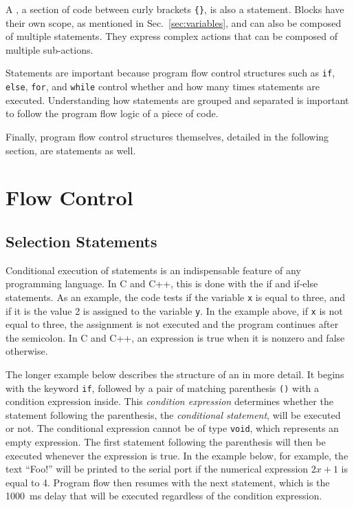 A , a section of code between curly brackets \texttt{\{\}}, is also a statement.
Blocks have their own scope, as mentioned in Sec.~\ref{sec:variables}, and can also be composed of multiple statements.
They express complex actions that can be composed of multiple sub-actions.

Statements are important because program flow control structures such as \texttt{if}, \texttt{else}, \texttt{for}, and \texttt{while} control whether and how many times statements are executed.
Understanding how statements are grouped and separated is important to follow the program flow logic of a piece of code.

Finally, program flow control structures themselves, detailed in the following section, are statements as well.

\section{Flow Control}
\subsection{Selection Statements}
Conditional execution of statements is an indispensable feature of any programming language.
In C and C++, this is done with the if and if-else statements.
As an example, the code  tests if the variable \texttt{x} is equal to three, and if it is the value 2 is assigned to the variable \texttt{y}.
In the example above, if \texttt{x} is not equal to three, the assignment is not executed and the program continues after the semicolon.
In C and C++, an expression is true when it is nonzero and false otherwise.

The longer example below describes the structure of an  in more detail.
It begins with the keyword \texttt{if}, followed by a pair of matching parenthesis \texttt{()} with a condition expression inside.
This \emph{condition expression} determines whether the statement following the parenthesis, the \emph{conditional statement}, will be executed or not.
The conditional expression cannot be of type \texttt{void}, which represents an empty expression.
The first statement following the parenthesis will then be executed whenever the expression is true.
In the example below, for example, the text ``Foo!'' will be printed to the serial port if the numerical expression $2x + 1$ is equal to 4.
Program flow then resumes with the next statement, which is the \SI{1000}{ms} delay that will be executed regardless of the condition expression.

